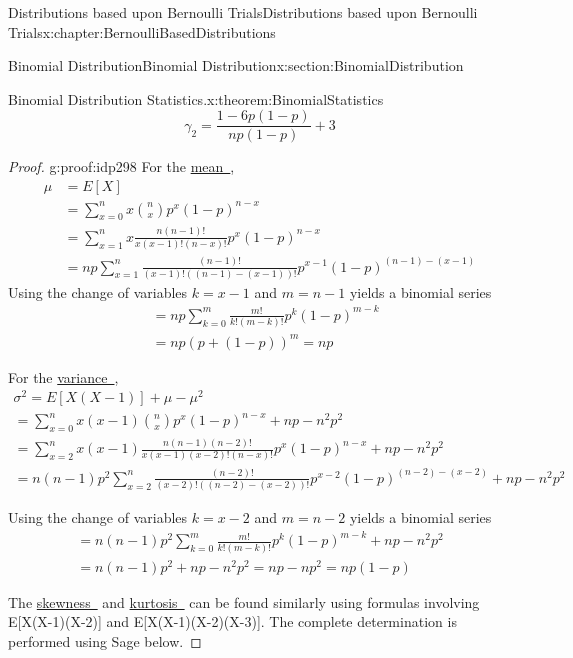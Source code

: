 \documentclass[oneside,10pt,]{book}
\newcommand{\xreffont}{\relax}
\numberwithin{equation}{section}
\begin{document}
\begin{chapterptx}{Distributions based upon Bernoulli Trials}{}{Distributions based upon Bernoulli Trials}{}{}{x:chapter:BernoulliBasedDistributions}
\begin{sectionptx}{Binomial Distribution}{}{Binomial Distribution}{}{}{x:section:BinomialDistribution}
\begin{theorem}{Binomial Distribution Statistics.}{}{x:theorem:BinomialStatistics}
%
\begin{equation*}
\gamma_2 = \frac{1-6p(1-p)}{np(1-p)} + 3
\end{equation*}
%
\end{theorem}
\begin{proof}{}{g:proof:idp298}
For the \hyperlink{x:li:TheoreticalMean}{mean~{\xreffont 1}},%
\begin{align*}
\mu & = E[X] \\
& = \sum_{x=0}^{n} {x \binom{n}{x} p^x (1-p)^{n-x}}\\
& = \sum_{x=1}^{n} {x \frac{n(n-1)!}{x(x-1)!(n-x)!} p^x (1-p)^{n-x}}\\
& = np \sum_{x=1}^{n} {\frac{(n-1)!}{(x-1)!((n-1)-(x-1))!} p^{x-1} (1-p)^{(n-1)-(x-1)}}
\end{align*}
Using the change of variables \(k=x-1\) and \(m = n-1\) yields a binomial series%
\begin{align*}
& = np \sum_{k=0}^{m} {\frac{m!}{k!(m-k)!} p^k (1-p)^{m-k}}\\
& = np (p + (1-p))^m = np
\end{align*}
%
\par
For the \hyperlink{x:li:TheoreticalVariance}{variance~{\xreffont 2}},%
\begin{gather*}
\sigma^2  = E[X(X-1)] + \mu - \mu^2 \\
= \sum_{x=0}^{n} {x(x-1) \binom{n}{x} p^x (1-p)^{n-x}} + np - n^2p^2\\
= \sum_{x=2}^{n} {x(x-1) \frac{n(n-1)(n-2)!}{x(x-1)(x-2)!(n-x)!} p^x (1-p)^{n-x}}  + np - n^2p^2\\
= n(n-1)p^2 \sum_{x=2}^{n} {\frac{(n-2)!}{(x-2)!((n-2)-(x-2))!} p^{x-2} (1-p)^{(n-2)-(x-2)}} + np - n^2p^2
\end{gather*}
%
\par
Using the change of variables \(k=x-2\) and \(m = n-2\) yields a binomial series%
\begin{gather*}
= n(n-1)p^2  \sum_{k=0}^{m} {\frac{m!}{k!(m-k)!} p^k (1-p)^{m-k}} + np - n^2p^2\\
= n(n-1)p^2 + np - n^2p^2 = np - np^2 = np(1-p)
\end{gather*}
%
\par
The \hyperlink{x:li:TheoreticalSkewness}{skewness~{\xreffont 3}} and \hyperlink{x:li:TheoreticalKurtosis}{kurtosis~{\xreffont 4}} can be found similarly using formulas involving E[X(X-1)(X-2)] and E[X(X-1)(X-2)(X-3)]. The complete determination is performed using Sage below.%
\end{proof}
%
\par

\end{sectionptx}
\end{chapterptx}
\end{document}
